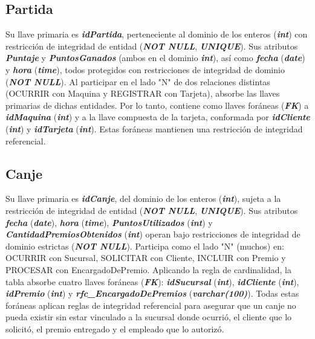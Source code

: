 \documentclass[11pt,letterpaper,spanish]{article}
\begin{document}
\subsection{Partida}
Su llave primaria es \textbf{\textit{idPartida}}, perteneciente al dominio de los enteros (\textbf{\textit{int}}) con restricción de integridad de entidad (\textbf{\textit{NOT NULL}}, \textbf{\textit{UNIQUE}}). Sus atributos \textbf{\textit{Puntaje}} y \textbf{\textit{PuntosGanados}} (ambos en el dominio \textbf{\textit{int}}), así como \textbf{\textit{fecha}} (\textbf{\textit{date}}) y \textbf{\textit{hora}} (\textbf{\textit{time}}), todos protegidos con restricciones de integridad de dominio (\textbf{\textit{NOT NULL}}). Al participar en el lado "N" de dos relaciones distintas (OCURRIR con Maquina y REGISTRAR con Tarjeta), absorbe las llaves primarias de dichas entidades. Por lo tanto, contiene como llaves foráneas (\textbf{\textit{FK}}) a \textbf{\textit{idMaquina}} (\textbf{\textit{int}}) y a la llave compuesta de la tarjeta, conformada por \textbf{\textit{idCliente}} (\textbf{\textit{int}}) y \textbf{\textit{idTarjeta}} (\textbf{\textit{int}}). Estas foráneas mantienen una restricción de integridad referencial.

\subsection{Canje}
Su llave primaria es \textbf{\textit{idCanje}}, del dominio de los enteros (\textbf{\textit{int}}), sujeta a la restricción de integridad de entidad (\textbf{\textit{NOT NULL}}, \textbf{\textit{UNIQUE}}). Sus atributos \textbf{\textit{fecha}} (\textbf{\textit{date}}), \textbf{\textit{hora}} (\textbf{\textit{time}}), \textbf{\textit{PuntosUtilizados}} (\textbf{\textit{int}}) y \textbf{\textit{CantidadPremiosObtenidos}} (\textbf{\textit{int}}) operan bajo restricciones de integridad de dominio estrictas (\textbf{\textit{NOT NULL}}). Participa como el lado "N" (muchos) en: OCURRIR con Sucursal, SOLICITAR con Cliente, INCLUIR con Premio y PROCESAR con EncargadoDePremio. Aplicando la regla de cardinalidad, la tabla absorbe cuatro llaves foráneas (\textbf{\textit{FK}}): \textbf{\textit{idSucursal}} (\textbf{\textit{int}}), \textbf{\textit{idCliente}} (\textbf{\textit{int}}), \textbf{\textit{idPremio}} (\textbf{\textit{int}}) y \textbf{\textit{rfc\_EncargadoDePremios}} (\textbf{\textit{varchar(100)}}). Todas estas foráneas aplican reglas de integridad referencial para asegurar que un canje no pueda existir sin estar vinculado a la sucursal donde ocurrió, el cliente que lo solicitó, el premio entregado y el empleado que lo autorizó.
\end{document}
